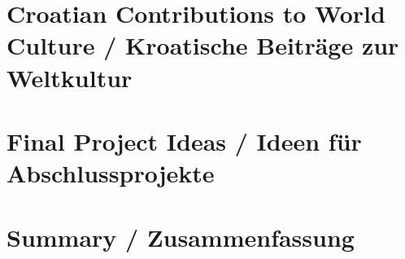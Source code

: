 \section{Croatian Contributions to World Culture / Kroatische Beiträge zur Weltkultur}

\section{Final Project Ideas / Ideen für Abschlussprojekte}

\section{Summary / Zusammenfassung}
